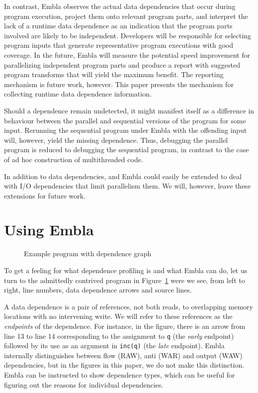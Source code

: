 \documentclass{acm_proc_article-sp}
\begin{document}
In contrast, Embla
observes the actual data dependencies that occur during program
execution, project them onto relevant program parts, and interpret the
lack of a runtime data dependence as an indication that the program
parts involved are likely to be independent.
Developers will be responsible for selecting
program inputs that generate representative program executions with
good coverage.  In the future, Embla will measure the potential speed
improvement for parallelizing independent program parts and produce a
report with suggested program transforms that will yield the maximum
benefit.  The reporting mechanism is future work, however.  This paper
presents the mechanism for collecting runtime data dependence information.

Should a dependence remain undetected, it might manifest itself as a 
difference in behaviour between the parallel and sequential versions of the
program for some input. Rerunning the sequential program under
Embla with the offending input will, however, yield the missing dependence.
Thus, debugging the parallel program is reduced to debugging the sequential 
program, in contrast to the case of ad hoc construction of multithreaded
code.

In addition to data dependencies, and Embla could easily be extended to
deal with I/O dependencies that limit parallelism them. We will, however,
leave these extensions for future work.



\section{Using Embla}

\begin{figure} 
\small

\caption{Example program with dependence graph} \label{ffirstex}
\end{figure}

To get a feeling for what dependence profiling is and what Embla can do, 
let us turn to the admittedly contrived program in Figure~\ref{ffirstex}
were we see, from left to right, line numbers, data dependence 
arrows and source lines. 

A data dependence is a pair
of references, not both reads, to overlapping memory
locations with no intervening write. We will refer to these
references as the {\em endpoints} of the dependence.
For instance, in the figure, 
there is an arrow from line 13 to line 14 corresponding to
the assignment to {\tt q} (the {\em early} endpoint) followed by its use 
as an argument in {\tt inc(q)} (the {\em late} endpoint). Embla
internally distinguishes between flow (RAW), anti (WAR) and output (WAW) 
dependencies, but in the figures in this paper, we do not make this
distinction. Embla can be instructed to show dependence types, which can be
useful for figuring out the reasons for individual dependencies.
\end{document}
